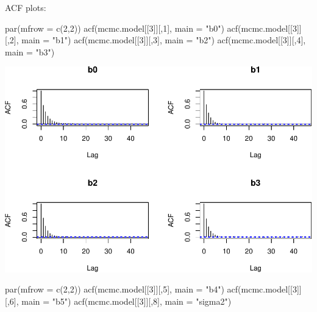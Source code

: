 \documentclass[
]{article}
\newenvironment{Shaded}{\begin{snugshade}}{\end{snugshade}}
\newcommand{\AttributeTok}[1]{\textcolor[rgb]{0.77,0.63,0.00}{#1}}
\newcommand{\DecValTok}[1]{\textcolor[rgb]{0.00,0.00,0.81}{#1}}
\newcommand{\FunctionTok}[1]{\textcolor[rgb]{0.00,0.00,0.00}{#1}}
\newcommand{\NormalTok}[1]{#1}
\newcommand{\StringTok}[1]{\textcolor[rgb]{0.31,0.60,0.02}{#1}}
\begin{document}
ACF plots:

\begin{Shaded}
\begin{Highlighting}[]
\FunctionTok{par}\NormalTok{(}\AttributeTok{mfrow =} \FunctionTok{c}\NormalTok{(}\DecValTok{2}\NormalTok{,}\DecValTok{2}\NormalTok{))}
\FunctionTok{acf}\NormalTok{(mcmc.model[[}\DecValTok{3}\NormalTok{]][,}\DecValTok{1}\NormalTok{], }\AttributeTok{main =} \StringTok{"b0"}\NormalTok{)}
\FunctionTok{acf}\NormalTok{(mcmc.model[[}\DecValTok{3}\NormalTok{]][,}\DecValTok{2}\NormalTok{], }\AttributeTok{main =} \StringTok{"b1"}\NormalTok{)}
\FunctionTok{acf}\NormalTok{(mcmc.model[[}\DecValTok{3}\NormalTok{]][,}\DecValTok{3}\NormalTok{], }\AttributeTok{main =} \StringTok{"b2"}\NormalTok{)}
\FunctionTok{acf}\NormalTok{(mcmc.model[[}\DecValTok{3}\NormalTok{]][,}\DecValTok{4}\NormalTok{], }\AttributeTok{main =} \StringTok{"b3"}\NormalTok{)}
\end{Highlighting}
\end{Shaded}

\includegraphics{final_report_files/figure-latex/acf-1.pdf}

\begin{Shaded}
\begin{Highlighting}[]
\FunctionTok{par}\NormalTok{(}\AttributeTok{mfrow =} \FunctionTok{c}\NormalTok{(}\DecValTok{2}\NormalTok{,}\DecValTok{2}\NormalTok{))}
\FunctionTok{acf}\NormalTok{(mcmc.model[[}\DecValTok{3}\NormalTok{]][,}\DecValTok{5}\NormalTok{], }\AttributeTok{main =} \StringTok{"b4"}\NormalTok{)}
\FunctionTok{acf}\NormalTok{(mcmc.model[[}\DecValTok{3}\NormalTok{]][,}\DecValTok{6}\NormalTok{], }\AttributeTok{main =} \StringTok{"b5"}\NormalTok{)}
\FunctionTok{acf}\NormalTok{(mcmc.model[[}\DecValTok{3}\NormalTok{]][,}\DecValTok{8}\NormalTok{], }\AttributeTok{main =} \StringTok{"sigma2"}\NormalTok{)}
\end{Highlighting}
\end{Shaded}
\end{document}
